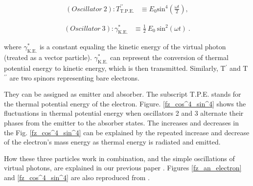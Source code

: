 \documentclass[reprint,amsmath,amssymb,aps,draft]{revtex4-1}
\numberwithin{equation}{section}%
\begin{document}
        \begin{equation}
            \begin{split}
                (Oscillator \ 2):
                T^{\prime \prime}_{\mathrm{T.P.E.}} 
                    & \equiv E_{0} \mathrm{sin}^{4} \left( \frac{\omega t}{2} \right)
                    ,
                \label{ez_Osc_2_PE}
            \end{split}
        \end{equation}

        \begin{equation}
            \begin{split}
                (Oscillator \ 3): \gamma^{*}_\mathrm{K.E.}
                    & \equiv \frac{1}{2} \ E_{0} \ \mathrm{sin}^{2} (\omega t)
                    \ .
                \label{ez_Osc_1_KE}  
            \end{split}
        \end{equation}


    \noindent
    where $\gamma^{*}_\mathrm{K.E.}$ is a constant equaling the kinetic energy of the virtual photon (treated as a vector particle). $\gamma^{*}_\mathrm{K.E.}$ can represent the conversion of thermal potential energy to kinetic energy, which is then transmitted. Similarly, T$^{\prime}$ and T$^{\prime \prime}$ are two spinors representing bare electrons.

    They can be assigned as emitter and absorber. The subscript T.P.E. stands for the thermal potential energy of the electron. Figure. \ref{fz_cos^4_sin^4} shows the fluctuations in thermal potential energy when oscillators 2 and 3 alternate their phases from the emitter to the absorber states. The increases and decreases in the Fig. \ref{fz_cos^4_sin^4} can be explained by the repeated increase and decrease of the electron's mass energy as thermal energy is radiated and emitted.
 
    How these three particles work in combination, and the simple oscillations of virtual photons, are explained in our previous paper \cite{Hanamura}. Figures \ref{fz_an_electron} and \ref{fz_cos^4_sin^4} are also reproduced from \cite{Hanamura}.


\end{document}
